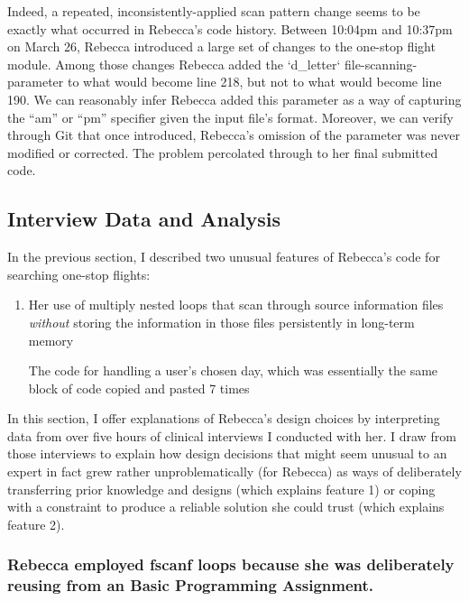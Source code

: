 Indeed, a repeated, inconsistently-applied scan pattern change seems to
be exactly what occurred in Rebecca's code history. Between 10:04pm and
10:37pm on March 26, Rebecca introduced a large set of changes to the
one-stop flight module. Among those changes Rebecca added the
`d\_letter` file-scanning-parameter to what would become line 218, but
not to what would become line 190. We can reasonably infer Rebecca added
this parameter as a way of capturing the ``am'' or ``pm'' specifier
given the input file's format. Moreover, we can verify through Git that
once introduced, Rebecca's omission of the parameter was never modified
or corrected. The problem percolated through to her final submitted
code.

\subsection{Interview Data and
Analysis}\label{interview-data-and-analysis}

In the previous section, I described two unusual features of Rebecca's
code for searching one-stop flights:

\begin{enumerate}
\def\labelenumi{\arabic{enumi}.}
\item
  Her use of multiply nested loops that scan through source information
  files \emph{without} storing the information in those files
  persistently in long-term memory

  The code for handling a user's chosen day, which was essentially the
  same block of code copied and pasted 7 times
\end{enumerate}

In this section, I offer explanations of Rebecca's design choices by
interpreting data from over five hours of clinical interviews I
conducted with her. I draw from those interviews to explain how design
decisions that might seem unusual to an expert in fact grew rather
unproblematically (for Rebecca) as ways of deliberately transferring
prior knowledge and designs (which explains feature 1) or coping with a
constraint to produce a reliable solution she could trust (which
explains feature 2).

\subsubsection{Rebecca employed fscanf loops because she was
deliberately reusing from an Basic Programming
Assignment.}\label{rebecca-employed-fscanf-loops-because-she-was-deliberately-reusing-from-an-basic-programming-assignment.}


